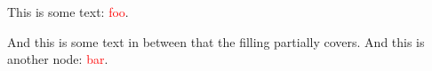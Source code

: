 \documentclass{article}
\begin{document}
This is some text: \textcolor{red}{foo}.
And this is some text in between that the filling partially covers.
And this is another node: \textcolor{red}{bar}.
\end{document}
